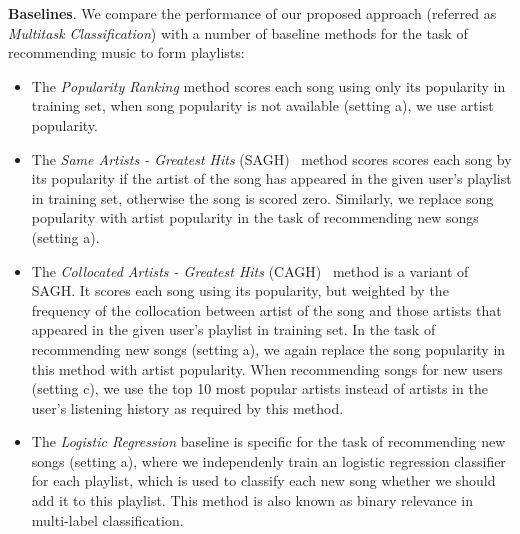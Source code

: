 {\bf Baselines}.
We compare the performance of our proposed approach (referred as {\it Multitask Classification}) 
with a number of baseline methods for the task of recommending music to form playlists:
\begin{itemize}
\item The {\it Popularity Ranking} method scores each song using only its popularity in training set, 
      when song popularity is not available (setting a), we use artist popularity.
\item The {\it Same Artists - Greatest Hits} (SAGH)~\cite{mcfee2012million} method scores scores each song
      by its popularity if the artist of the song has appeared in the given user's playlist in training set,
      otherwise the song is scored zero.
      Similarly, we replace song popularity with artist popularity in the task of recommending new songs (setting a).
\item The {\it Collocated Artists - Greatest Hits} (CAGH)~\cite{bonnin2013evaluating} method is a variant of SAGH.
      It scores each song using its popularity, but weighted by the frequency of the collocation between artist of the song
      and those artists that appeared in the given user's playlist in training set.
      In the task of recommending new songs (setting a), we again replace the song popularity in this method with artist popularity.
      When recommending songs for new users (setting c), we use the top 10 most popular artists instead of artists in the user's
      listening history as required by this method.
\item The {\it Logistic Regression} baseline is specific for the task of recommending new songs (setting a), where we independenly train
      an logistic regression classifier for each playlist, which is used to classify each new song whether we should add it to this playlist.
      This method is also known as binary relevance in multi-label classification.
\end{itemize}


